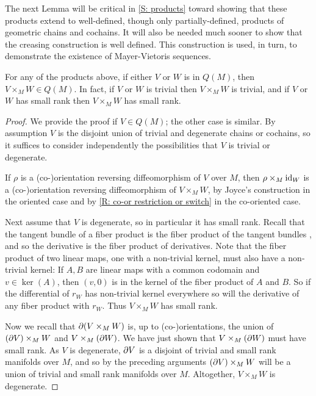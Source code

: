 The next Lemma will be critical in \cref{S: products} toward showing that these products extend to well-defined, though only partially-defined, products of geometric chains and cochains. It will also be needed much sooner to show that the creasing construction is well defined. This construction is used, in turn, to demonstrate the existence of Mayer-Vietoris sequences.

\begin{lemma}\label{L: pullback with Q}
For any of the products above, if either $V$ or $W$ is in $Q(M)$, then $V \times_M W \in Q(M)$. In fact, if $V$ or $W$ is trivial then $V \times_M W$ is trivial, and if $V$ or $W$ has small rank then $V \times_M W$ has small rank.
\end{lemma}
\begin{proof}
We provide the proof if $V \in Q(M)$; the other case is similar. By assumption $V$ is the disjoint union of trivial and degenerate chains or cochains, so it suffices to consider independently the possibilities that $V$ is trivial or degenerate.

If $\rho$ is a (co-)orientation reversing diffeomorphism of $V$ over $M$, then $\rho \times_M \mathrm{id}_W$ is a (co-)orientation reversing diffeomorphism of $V \times_M W$, by Joyce's construction in the oriented case and by \cref{R: co-or restriction or switch} in the co-oriented case.

Next assume that $V$ is degenerate, so in particular it has small rank. Recall that the tangent bundle of a fiber product is the fiber product of the tangent bundles \cite[Theorem 5.47]{Wed16}, and so the derivative is the fiber product of derivatives.
Note that the fiber product of two linear maps, one with a non-trivial kernel, must also have a non-trivial kernel: If $A,B$ are linear maps with a common codomain and $v \in \ker(A)$, then $(v,0)$ is in the kernel of the fiber product of $A$ and $B$.
So if the differential of $r_W$ has non-trivial kernel everywhere so will the derivative of any fiber product with $r_W$. Thus $V \times_M W$ has small rank.

Now we recall that $\partial(V \times_M W)$ is, up to (co-)orientations, the union of $(\partial V) \times_M W$ and $V \times_M (\partial W)$. We have just shown that $V \times_M (\partial W)$ must have small rank. As $V$ is degenerate, $\partial V$ is a disjoint of trivial and small rank manifolds over $M$, and so by the preceding arguments $(\partial V) \times_M W$ will be a union of trivial and small rank manifolds over $M$. Altogether, $V \times_M W$ is degenerate.
\end{proof}

